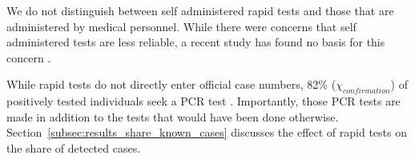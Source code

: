 We do not distinguish between self administered rapid tests and those that are
administered by medical personnel. While there were concerns that self administered
tests are less reliable, a recent study has found no basis for this concern
\citep{Lindner2020}.

While rapid tests do not directly enter official case numbers, 82\%
($\chi_{confirmation}$) of positively tested individuals seek a PCR test
\citep{Betsch2021}. Importantly, those PCR tests are made in addition to the tests that
would have been done otherwise. Section~\ref{subsec:results_share_known_cases} discusses
the effect of rapid tests on the share of detected cases.

